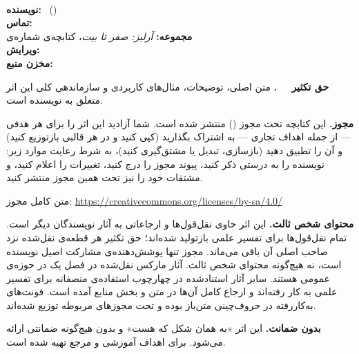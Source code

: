 \thispagestyle{empty}
\vspace*{0.8cm}
{\small\linespread{1.3}\selectfont

\textbf{\BookletTitle}\\[0.2em]
{\color{textsecondary}\BookletSubtitle}

\vspace{0.9em}

\textbf{نویسنده:}  \BookletAuthor\ (\lr{\BookletAuthorHandle})\\
\textbf{تماس:}     \href{mailto:\BookletEmail}{\lr{\BookletEmail}}\\
\textbf{مجموعه:}   \textit{آرلیز: صفر تا بیت}،
                   کتابچه‌ی شماره‌ی~\BookletNumber\\
\textbf{ویرایش:}   \BookletEdition\\
%
\textbf{مخزن منبع:}
  \href{https://github.com/papyrxis/arliz}{}

\vspace{0.9em}

\textbf{حق تکثیر \textcopyright\ \BookletYear\ \BookletAuthor.}
متن اصلی، توضیحات، مثال‌های کاربردی و سازماندهی کلی این اثر متعلق به نویسنده است.

\vspace{0.7em}

\textbf{مجوز.}
این کتابچه تحت مجوز
\textbf{}
()
منتشر شده است. شما آزادید این اثر را برای هر هدفی — از جمله اهداف تجاری —
به اشتراک بگذارید (کپی کنید و در هر قالبی بازتوزیع کنید) و آن را تطبیق دهید
(بازسازی، تبدیل یا مشتق‌گیری کنید)، به شرط رعایت موارد زیر: نویسنده را
به درستی ذکر کنید، پیوند مجوز را درج کنید، تغییرات را اعلام کنید، و
مشتقات خود را نیز تحت همین مجوز  منتشر کنید.

متن کامل مجوز: \url{https://creativecommons.org/licenses/by-sa/4.0/}

\vspace{0.7em}
\newpage
\textbf{محتوای شخص ثالث.}
این اثر حاوی نقل‌قول‌ها و ارجاعاتی به آثار نویسندگان دیگر است.
تمام نقل‌قول‌ها برای تفسیر علمی بازتولید شده‌اند؛ حق تکثیر هر قطعه‌ی
نقل‌شده نزد صاحب اصلی آن باقی می‌ماند. مجوز  تنها
پوشش‌دهنده‌ی مشارکت اصیل نویسنده است، نه هیچ‌گونه محتوای شخص ثالث.
آثار مارکس نقل‌شده در فصل یک در حوزه‌ی عمومی هستند. سایر آثار استناد‌شده
در چهارچوب استفاده‌ی منصفانه برای تفسیر علمی به کار رفته‌اند و ارجاع
کامل آن‌ها در متن و بخش منابع آمده است. فونت‌های به‌کاررفته در حروف‌چینی
متن‌باز بوده و تحت مجوزهای مربوطه توزیع شده‌اند.

\vspace{0.7em}

\textbf{بدون ضمانت.}
این اثر «به همان شکل که هست» و بدون هیچ‌گونه ضمانتی ارائه می‌شود.
برای اهداف آموزشی و مرجع تهیه شده است.

}%
\clearpage